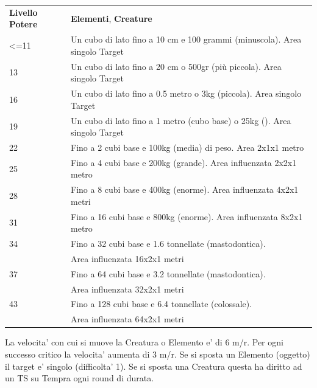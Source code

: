 \documentclass[a4paper,11pt,twoside,openany]{book}
\begin{document}
\begin{tabularx}{0.95\textwidth}{lX}
	\toprule
	\textbf{Livello Potere} & \textbf{Elementi}, \textbf{Creature}\\
	\textless=11            & Un cubo di lato fino a 10 cm e 100 grammi (minuscola). Area singolo
	Target\\
	13          & Un cubo di lato fino a 20 cm o 500gr (più piccola). Area singolo Target\\
	16          & Un cubo di lato fino a 0.5 metro o 3kg (piccola). Area singolo Target\\
	19          & Un cubo di lato fino a 1 metro (cubo base) o 25kg (). Area singolo
	Target\\
	22          & Fino a 2 cubi base e 100kg (media) di peso. Area 2x1x1 metro\\
	25          & Fino a 4 cubi base e 200kg (grande). Area influenzata 2x2x1 metro\\
	28          & Fino a 8 cubi base e 400kg (enorme). Area influenzata 4x2x1 metri\\
	31          & Fino a 16 cubi base e 800kg (enorme). Area influenzata 8x2x1 metro\\
	34          & Fino a 32 cubi base e 1.6 tonnellate (mastodontica).\\
	            & Area influenzata 16x2x1 metri\\
	37          & Fino a 64 cubi base e 3.2 tonnellate (mastodontica).    \\
	            & Area influenzata 32x2x1 metri\\
	43          & Fino a 128 cubi base e 6.4 tonnellate (colossale).  \\
	            & Area influenzata 64x2x1 metri\\
\end{tabularx}

La velocita' con cui si muove la Creatura o Elemento e' di 6 m/r. Per ogni successo critico la velocita' aumenta di 3 m/r.
Se si sposta un Elemento (oggetto) il target e' singolo (difficolta' 1).
Se si sposta una Creatura questa ha diritto ad un TS su Tempra ogni round di durata.
\bigskip\
\end{document}
